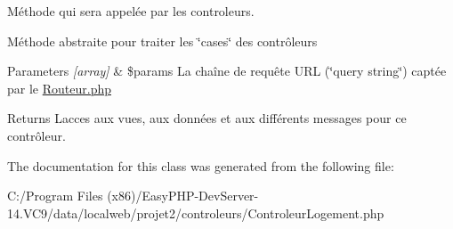 Méthode qui sera appelée par les controleurs. 

Méthode abstraite pour traiter les \char`\"{}cases\char`\"{} des contrôleurs 
\begin{DoxyParams}{Parameters}
{\em \mbox{[}array\mbox{]}} & \$params La chaîne de requête U\+RL (\char`\"{}query string\char`\"{}) captée par le \hyperlink{_routeur_8php}{Routeur.\+php} \\
\hline
\end{DoxyParams}
\begin{DoxyReturn}{Returns}
L\textquotesingle{}acces aux vues, aux données et aux différents messages pour ce contrôleur. 
\end{DoxyReturn}


The documentation for this class was generated from the following file\+:\begin{DoxyCompactItemize}
\item 
C\+:/\+Program Files (x86)/\+Easy\+P\+H\+P-\/\+Dev\+Server-\/14.\+V\+C9/data/localweb/projet2/controleurs/Controleur\+Logement.\+php\end{DoxyCompactItemize}
